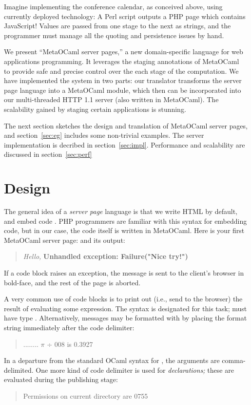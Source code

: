 \documentclass[preprint]{acm_proc_article-sp}
\def\MOC{MetaOCaml\xspace}
\begin{document}
Imagine implementing the conference calendar, as conceived
above, using currently deployed technology: A Perl script
outputs a PHP page which contains JavaScript!  Values are
passed from one stage to the next as strings, and the
programmer must manage all the quoting and persistence
issues by hand.

We present ``\MOC{} server pages,'' a new domain-specific
language for web applications programming.  It leverages the
staging annotations of \MOC~\cite{calcagno03meta,taha00metaml}
to provide safe and precise control over the each stage of the
computation.  We have implemented the system in two parts: our
translator transforms the server page language into a \MOC{}
module, which then can be incorporated into our multi-threaded
HTTP 1.1 server (also written in \MOC{}).  The scalability
gained by staging certain applications is stunning.

The next section sketches the design and translation of \MOC{}
server pages, and section~\ref{sec:eg} includes some non-trivial
examples.  The server implementation is decribed in
section~\ref{sec:impl}.  Performance and scalability are
discussed in section~\ref{sec:perf}

\section{Design}
\label{sec:design}

The general idea of a \emph{server page} language is that we
  write HTML by default, and embed code %
.
PHP programmers are familiar with this syntax for embedding code, but
in our case, the code itself is written in \MOC.  Here is your first
\MOC{} server page:
and its output:
\begin{quote}
  \textit{Hello,} \textbf{Unhandled exception: Failure("Nice try!")}
\end{quote}
If a code block raises an exception, the message is sent to the
client's browser in bold-face, and the rest of the page is
aborted. 

A very common use of code blocks is to print out (i.e., send to
the browser) the result of evaluating some expression.  The
syntax  is designated for this task;  must
have type .  Alternatively, messages may be formatted
with  by placing the format string immediately after
the code delimiter: 
\begin{quote}
  ........ $\pi$ ÷ 008 is 0.3927
\end{quote}
In a departure from the standard OCaml syntax for , the
arguments are comma-delimited.
One more kind of code delimiter is used for \emph{declarations;}
these are evaluated during the publishing stage:
\begin{quote}
Permissions on current directory are 0755
\end{quote}
\end{document}

